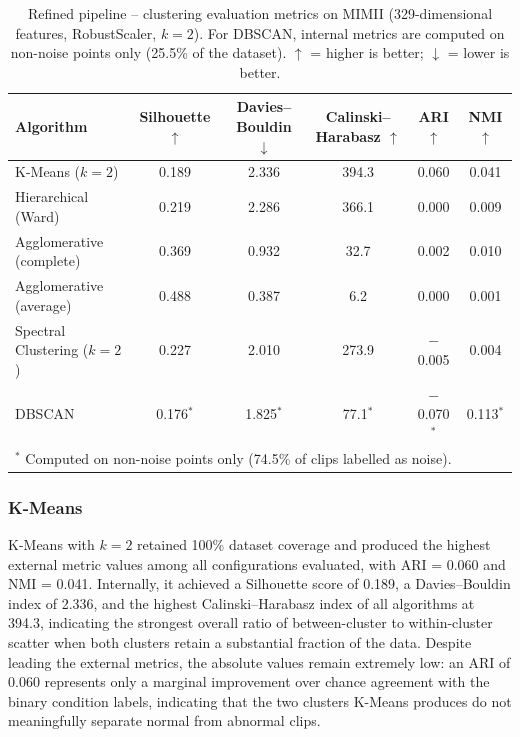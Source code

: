 \documentclass[runningheads,a4paper,11pt]{report}
\begin{document}
\begin{table}[htbp]
    \centering
    \small
    \caption{Refined pipeline -- clustering evaluation metrics on MIMII (329-dimensional features, RobustScaler, $k=2$). For DBSCAN, internal metrics are computed on non-noise points only (25.5\% of the dataset). $\uparrow$ = higher is better; $\downarrow$ = lower is better.}
    \label{tab:metrics_mimii}
    \begin{tabular}{lccccc}
        \hline
        \textbf{Algorithm} & \textbf{Silhouette} $\uparrow$ & \textbf{Davies--Bouldin} $\downarrow$ & \textbf{Calinski--Harabasz} $\uparrow$ & \textbf{ARI} $\uparrow$ & \textbf{NMI} $\uparrow$ \\
        \hline
        K-Means ($k=2$)                     & 0.189   & 2.336   & 394.3   & 0.060   & 0.041   \\
        Hierarchical (Ward)                 & 0.219   & 2.286   & 366.1   & 0.000   & 0.009   \\
        Agglomerative (complete)            & 0.369   & 0.932   & 32.7    & 0.002   & 0.010   \\
        Agglomerative (average)             & 0.488   & 0.387   & 6.2     & 0.000   & 0.001   \\
        Spectral Clustering ($k=2$)         & 0.227   & 2.010   & 273.9   & $-$0.005 & 0.004  \\
        DBSCAN                              & 0.176$^*$ & 1.825$^*$ & 77.1$^*$ & $-$0.070$^*$ & 0.113$^*$ \\
        \hline
        \multicolumn{6}{l}{\footnotesize $^*$ Computed on non-noise points only (74.5\% of clips labelled as noise).}
    \end{tabular}
\end{table}

\subsubsection{K-Means}

K-Means with $k = 2$ retained 100\% dataset coverage and produced the highest external metric values among all configurations evaluated, with ARI = 0.060 and NMI = 0.041. Internally, it achieved a Silhouette score of 0.189, a Davies--Bouldin index of 2.336, and the highest Calinski--Harabasz index of all algorithms at 394.3, indicating the strongest overall ratio of between-cluster to within-cluster scatter when both clusters retain a substantial fraction of the data. Despite leading the external metrics, the absolute values remain extremely low: an ARI of 0.060 represents only a marginal improvement over chance agreement with the binary condition labels, indicating that the two clusters K-Means produces do not meaningfully separate normal from abnormal clips.
\end{document}

